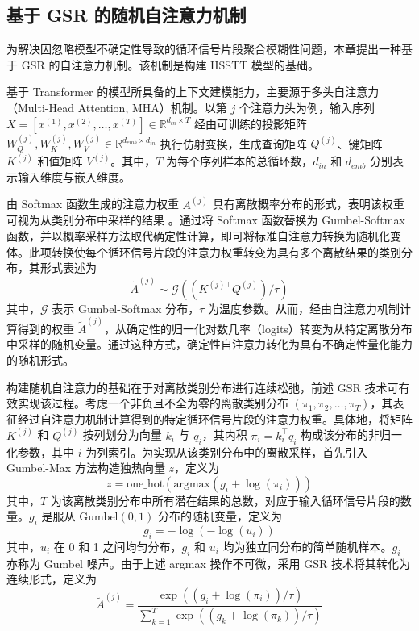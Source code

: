 \subsection{基于 GSR 的随机自注意力机制}\label{subsec:stochastic_attention}

为解决因忽略模型不确定性导致的循环信号片段聚合模糊性问题，本章提出一种基于 GSR 的自注意力机制。该机制是构建 HSSTT 模型的基础。

基于 Transformer 的模型所具备的上下文建模能力，主要源于多头自注意力（Multi-Head Attention, MHA）机制。以第 $j$ 个注意力头为例，输入序列 $X=[x^{(1)}, x^{(2)}, \dots, x^{(T)}] \in \mathbb{R}^{d_{in} \times T}$ 经由可训练的投影矩阵 $W_Q^{(j)}, W_K^{(j)}, W_V^{(j)} \in \mathbb{R}^{d_{emb} \times d_{in}}$ 执行仿射变换，生成查询矩阵 $Q^{(j)}$、键矩阵 $K^{(j)}$ 和值矩阵 $V^{(j)}$。其中，$T$ 为每个序列样本的总循环数，$d_{in}$ 和 $d_{emb}$ 分别表示输入维度与嵌入维度。

由 Softmax 函数生成的注意力权重 $A^{(j)}$ 具有离散概率分布的形式，表明该权重可视为从类别分布中采样的结果 \cite{20193407356730, 20230613569727}。通过将 Softmax 函数替换为 Gumbel-Softmax 函数，并以概率采样方法取代确定性计算，即可将标准自注意力转换为随机化变体。此项转换使每个循环信号片段的注意力权重转变为具有多个离散结果的类别分布，其形式表述为
% 
\begin{equation}
  \tilde{A}^{(j)} \sim \mathcal{G}((K^{(j)\top}Q^{(j)}) / \tau)
\end{equation}
% 
其中，$\mathcal{G}$ 表示 Gumbel-Softmax 分布，$\tau$ 为温度参数。从而，经由自注意力机制计算得到的权重 $\tilde{A}^{(j)}$，从确定性的归一化对数几率（logits）转变为从特定离散分布中采样的随机变量。通过这种方式，确定性自注意力转化为具有不确定性量化能力的随机形式。

构建随机自注意力的基础在于对离散类别分布进行连续松弛，前述 GSR 技术可有效实现该过程。考虑一个非负且不全为零的离散类别分布 $(\pi_1, \pi_2, \dots, \pi_T)$，其表征经过自注意力机制计算得到的特定循环信号片段的注意力权重。具体地，将矩阵 $K^{(j)}$ 和 $Q^{(j)}$ 按列划分为向量 $k_i$ 与 $q_i$，其内积 $\pi_i = k_i^\top q_i$ 构成该分布的非归一化参数，其中 $i$ 为列索引。为实现从该类别分布中的离散采样，首先引入 Gumbel-Max 方法构造独热向量 $z$，定义为
% 
\begin{equation}
  z = \text{one\_hot}(\text{argmax}(g_i + \log(\pi_i)))
\end{equation}
% 
其中，$T$ 为该离散类别分布中所有潜在结果的总数，对应于输入循环信号片段的数量。$g_i$ 是服从 $\text{Gumbel}(0,1)$ 分布的随机变量，定义为
% 
\begin{equation}
  g_i = -\log(-\log(u_i))
\end{equation}
% 
其中，$u_i$ 在 0 和 1 之间均匀分布，$g_i$ 和 $u_i$ 均为独立同分布的简单随机样本。$g_i$ 亦称为 Gumbel 噪声。由于上述 argmax 操作不可微，采用 GSR 技术将其转化为连续形式，定义为
% 
\begin{equation}
\tilde{A}^{(j)} = \frac{\exp((g_i + \log(\pi_i))/\tau)}{\sum_{k=1}^{T}\exp((g_k + \log(\pi_k))/\tau)}
\end{equation}


